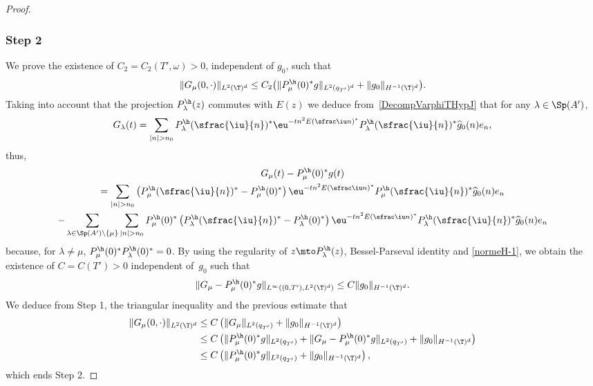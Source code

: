 \begin{proof}
\subsubsection*{Step 2}
We prove the existence of $C_2\!=\!C_2(T',\omega)\!>\!0$, independent of $g_0$, such that
\begin{equation} \label{HF_Hyp_Step2}
\lVert{{G_\mu}(0,\cdot)}\rVert_{L^2(\T)^{d}} \leq C_2 \bigl(\|P^\h_\mu(0)^* g \|_{L^2(q_{T'})^d} + \| g_0\|_{H^{-1}(\T)^d} \bigr).
\end{equation}
Taking into account that the projection $P^\h_\lambda(z)$ commutes with $E(z)$ we deduce from~\eqref{DecompVarphiTHypJ} that for any $\lambda \in \Sp(A')$,
\[
G_\lambda(t) = \sum_{|n| > n_0} P_\lambda^\h(\sfrac{\iu}{n})^* \eu^{-t n^2 {E}\left(\sfrac \iu n\right)^*} P_\lambda^\h(\sfrac{\iu}{n})^* \widehat{g}_0(n) e_n,
\]
thus,
\begin{multline} \label{Gmu_Phmu_decom}
G_{\mu}(t)-P^\h_\mu(0)^* g(t)\\
=\sum_{|n|>n_0} \left(P_\mu^\h(\sfrac{\iu}{n})^* - P^\h_\mu(0)^* \right) \eu^{-t n^2 {E}\left(\sfrac \iu n\right)^*} P_\mu^\h(\sfrac{\iu}{n})^*\widehat{g}_0(n) e_n
\\
- \sum_{\lambda \in \Sp(A') \setminus \{\mu\}} \sum_{|n| > n_0} P^\h_\mu(0)^* \left(P_\lambda^\h(\sfrac{\iu}{n})^* - P_\lambda^\h (0)^* \right) \eu^{-t n^2 {E}\left(\sfrac \iu n\right)^*}P_\lambda^\h(\sfrac{\iu}{n})^* \widehat{g}_0(n) e_n
\end{multline}
because, for $\lambda \neq \mu$, $P^\h_\mu(0)^* P_\lambda^\h (0)^*=0$. By using the regularity of $z\mto P^\h_\lambda(z)$, Bessel-Parseval identity and \eqref{normeH-1}, we obtain the existence of $C=C(T')>0$ independent of~$g_0$ such that
\[
\|G_{\mu} -P^\h_\mu(0)^* g \|_{L^\infty((0,T'),L^2(\T)^d)} \leq C \| g_0\|_{H^{-1}(\T)^d}.
\]
We deduce from Step 1, the triangular inequality and the previous estimate that
\begin{align*}
\lVert{{G_\mu}(0,\cdot)}\rVert_{L^2(\T)^{d}}
& \leq C \left(\|G_\mu\|_{L^2(q_{T'})} + \| g_0\|_{H^{-1}(\T)^d} \right)
\\ & \leq C \left(\|P^\h_\mu(0)^* g\|_{L^2(q_{T'})} + \|G_\mu - P^\h_\mu(0)^* g \|_{L^2(q_{T'})} + \| g_0\|_{H^{-1}(\T)^d} \right)
\\ & \leq C \left(\|P^\h_\mu(0)^* g\|_{L^2(q_{T'})}+ \| g_0\|_{H^{-1}(\T)^d} \right),
\end{align*}
which ends Step 2.


\end{proof}
